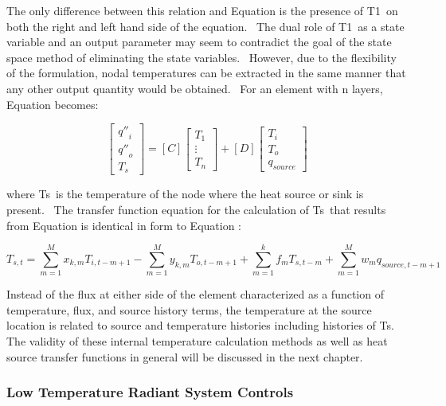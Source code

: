 The only difference between this relation and Equation is the presence of T1~on both the right and left hand side of the equation.~ The dual role of T1~as a state variable and an output parameter may seem to contradict the goal of the state space method of eliminating the state variables.~ However, due to the flexibility of the formulation, nodal temperatures can be extracted in the same manner that any other output quantity would be obtained.~ For an element with n layers, Equation becomes:

\begin{equation}
\left[ {\begin{array}{*{20}{c}}{{{q''}_i}}\\ {{{q''}_o}}\\ {{T_s}}\end{array}} \right] = \left[ C \right]\left[ {\begin{array}{*{20}{c}}{{T_1}}\\ \vdots \\ {{T_n}}\end{array}} \right] + \left[ D \right]\left[ {\begin{array}{*{20}{c}}{{T_i}}\\ {{T_o}}\\ {{q_{source}}}\end{array}} \right]
\end{equation}

where Ts~is the temperature of the node where the heat source or sink is present.~ The transfer function equation for the calculation of Ts~that results from Equation is identical in form to Equation :

\begin{equation}
{T_{s,t}} = \sum\limits_{m = 1}^M {{x_{k,m}}{T_{i,t - m + 1}}}  - \sum\limits_{m = 1}^M {{y_{k,m}}{T_{o,t - m + 1}}}  + \sum\limits_{m = 1}^k {{f_m}{T_{s,t - m}}}  + \sum\limits_{m = 1}^M {{w_m}{q_{source,t - m + 1}}}
\end{equation}

Instead of the flux at either side of the element characterized as a function of temperature, flux, and source history terms, the temperature at the source location is related to source and temperature histories including histories of Ts.~ The validity of these internal temperature calculation methods as well as heat source transfer functions in general will be discussed in the next chapter.

\subsubsection{Low Temperature Radiant System Controls}\label{low-temperature-radiant-system-controls}

